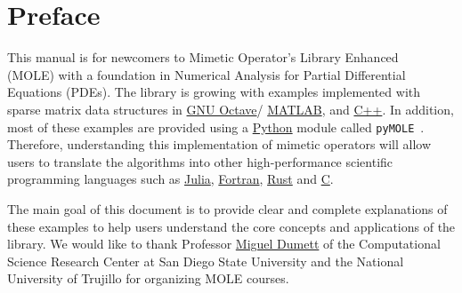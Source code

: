 \chapter{Preface}

This manual is for newcomers to Mimetic Operator's Library
Enhanced~\cite{Corbino2024} (MOLE) with a foundation in Numerical
Analysis for Partial Differential Equations (PDEs).
The library is growing with examples implemented with sparse matrix
data structures in
\href{https://octave.org}{GNU Octave}/
\href{https://www.mathworks.com/products/matlab.html}{MATLAB},
and \href{https://isocpp.org}{C++}.
In addition, most of these examples are provided using a
\href{https://www.python.org}{Python} module called
\texttt{pyMOLE}~\cite{Aznarán2025}.
Therefore, understanding this implementation of mimetic operators
will allow users to translate the algorithms into other
high-performance scientific programming languages such as
\href{https://julialang.org}{Julia},
\href{https://fortran-lang.org}{Fortran},
\href{https://www.rust-lang.org}{Rust} and
\href{https://www.open-std.org/jtc1/sc22/wg14}{C}.

The main goal of this document is to provide clear and complete
explanations of these examples to help users understand the core
concepts and applications of the library.
We would like to thank Professor
\href{https://ctivitae.concytec.gob.pe/appDirectorioCTI/VerDatosInvestigador.do?id_investigador=45848}{Miguel Dumett}
of the Computational Science Research Center at San Diego State
University and the National University of Trujillo for organizing
MOLE courses.

